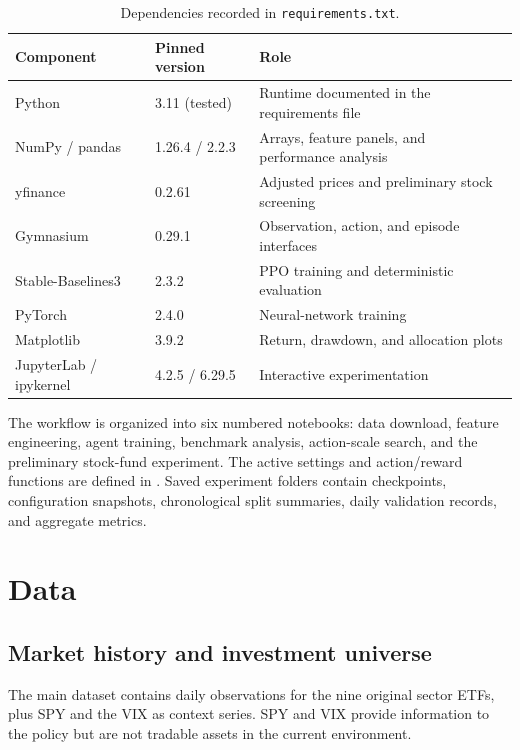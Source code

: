 \documentclass[11pt,letterpaper]{article}
\begin{document}
\begin{table}[htbp]
\centering
\small
\begin{tabularx}{\linewidth}{@{}l l Y@{}}
\toprule
Component & Pinned version & Role \\
\midrule
Python & 3.11 (tested) & Runtime documented in the requirements file \\
NumPy / pandas & 1.26.4 / 2.2.3 & Arrays, feature panels, and performance analysis \\
yfinance & 0.2.61 & Adjusted prices and preliminary stock screening \\
Gymnasium & 0.29.1 & Observation, action, and episode interfaces \\
Stable-Baselines3 & 2.3.2 & PPO training and deterministic evaluation \\
PyTorch & 2.4.0 & Neural-network training \\
Matplotlib & 3.9.2 & Return, drawdown, and allocation plots \\
JupyterLab / ipykernel & 4.2.5 / 6.29.5 & Interactive experimentation \\
\bottomrule
\end{tabularx}
\caption{Dependencies recorded in \texttt{requirements.txt}.}
\end{table}

The workflow is organized into six numbered notebooks: data download, feature
engineering, agent training, benchmark analysis, action-scale search, and the
preliminary stock-fund experiment. The active settings and action/reward functions
are defined in . Saved experiment folders
contain checkpoints, configuration snapshots, chronological split summaries,
daily validation records, and aggregate metrics. 

\section{Data}

\subsection{Market history and investment universe}

The main dataset contains daily observations for the nine original sector ETFs, plus SPY and the VIX as context series. SPY and VIX provide information
to the policy but are not tradable assets in the current environment.
\end{document}
